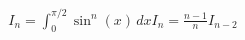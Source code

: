 \documentclass[preview]{standalone}
\begin{document}
\begin{align*}
I_n = \int_{0}^{\pi/2} \sin^n(x) \, dx I_n = \frac{n-1}{n} I_{n-2}
\end{align*}
\end{document}
